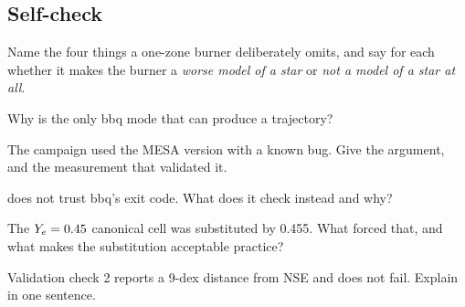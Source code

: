 \subsection{Self-check}
\label{sec:selfcheck-generator}

\begin{selfcheck}
\item Name the four things a one-zone burner deliberately omits, and say for
  each whether it makes the burner a \emph{worse model of a star} or \emph{not
  a model of a star at all}.
\item Why is  the only bbq mode that can produce a
  trajectory?
\item The campaign used the MESA version with a known bug. Give the argument,
  and the measurement that validated it.
\item {} does not trust bbq's exit code. What does it
  check instead and why?
\item The $Y_{e} = 0.45$ canonical cell was substituted by 0.455. What forced
  that, and what makes the substitution acceptable practice?
\item Validation check 2 reports a 9-dex distance from NSE and does not fail.
  Explain in one sentence.
\end{selfcheck}
